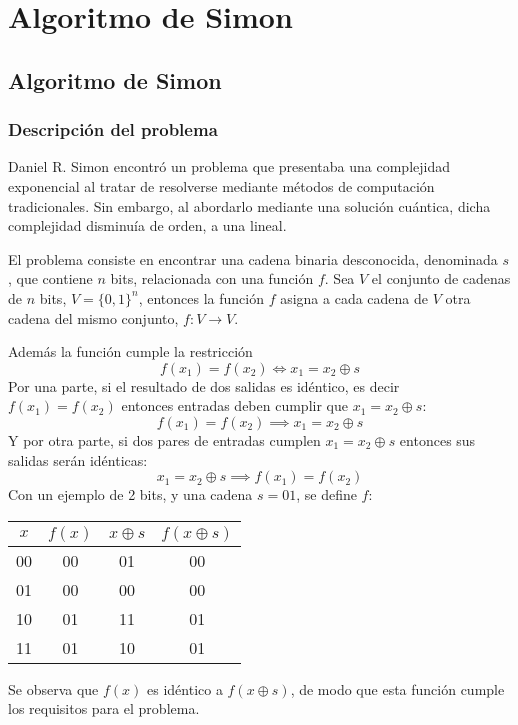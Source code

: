 \chapter{Algoritmo de Simon}
\section{Algoritmo de Simon}
\subsection{Descripción del problema}

Daniel R. Simon encontró un problema que presentaba una complejidad exponencial 
al tratar de resolverse mediante métodos de computación tradicionales. Sin 
embargo, al abordarlo mediante una solución cuántica, dicha complejidad 
disminuía de orden, a una lineal.

El problema consiste en encontrar una cadena binaria desconocida, denominada 
$s$, que contiene $n$ bits, relacionada con una función $f$. Sea $V$ el conjunto 
de cadenas de $n$ bits, $V = \{0,1\}^n$, entonces la función $f$ asigna a cada 
cadena de $V$ otra cadena del mismo conjunto, $f:V \rightarrow V$.

Además la función cumple la restricción
%
\begin{equation}
	\label{eq:simon_f}
	f(x_1) = f(x_2) \iff x_1 = x_2 \oplus s
\end{equation}
%
Por una parte, si el resultado de dos salidas es idéntico, es decir $f(x_1) = 
f(x_2)$ entonces entradas deben cumplir que $x_1 = x_2 \oplus s$:
%
$$ f(x_1) = f(x_2) \implies x_1 = x_2 \oplus s $$
%
Y por otra parte, si dos pares de entradas cumplen $x_1 = x_2 \oplus s$ entonces 
sus salidas serán idénticas:
%
$$ x_1 = x_2 \oplus s \implies f(x_1) = f(x_2) $$
%
Con un ejemplo de 2 bits, y una cadena $s = 01$, se define $f$:
%
\begin{center}
\begin{tabular}{|c|c||c|c|}
	\hline
	$x$ & $f(x)$ & $x \oplus s$ & $f(x \oplus s)$\\
	\hline
	00 & 00 & 01 & 00\\
	01 & 00 & 00 & 00\\
	10 & 01 & 11 & 01\\
	11 & 01 & 10 & 01\\
	\hline
\end{tabular}
\end{center}
%
Se observa que $f(x)$ es idéntico a $f(x \oplus s)$, de modo que esta función 
cumple los requisitos para el problema.

